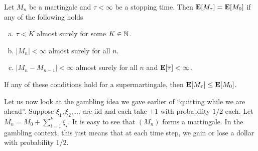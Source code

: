\begin{lemma}
	\label{optional stopping}
	Let $M_n$ be a martingale and $\tau<\infty$ be a stopping time. Then $\textbf{E}[M_\tau]=\textbf{E}[M_0]$ if any of the following holds
	\begin{enumerate}[(a)]
		\item $\tau<K$ almost surely for some $K\in\mathbb{N}$.
		\item $|M_n|<\infty$ almost surely for all $n$.
		\item $|M_n-M_{n-1}|<\infty$ almost surely for all $n$ and $\textbf{E}[\tau]<\infty$.
	\end{enumerate}
	If any of these conditions hold for a supermartingale, then $\textbf{E}[M_\tau]\leq\textbf{E}[M_0]$.
\end{lemma}

Let us now look at the gambling idea we gave earlier of ``quitting while we are ahead''. Suppose $\xi_1,\xi_2,\ldots$ are iid and each take $\pm 1$ with probability $1/2$ each. Let $M_n = M_0 + \sum_{i=1}^k \xi_i$. It is easy to see that $(M_n)$ forms a martingale. In the gambling context, this just means that at each time step, we gain or lose a dollar with probability $1/2$.
